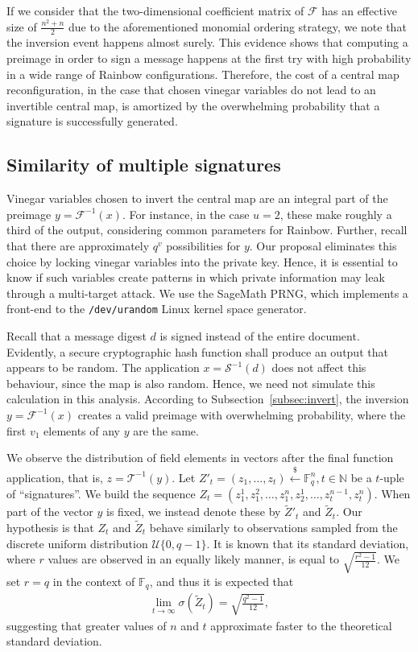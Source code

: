 \documentclass[draft, 12pt, a4paper, oneside]{memoir}
\newcommand{\random}{\stackrel{\$}{\longleftarrow}}
\theoremstyle{definition}
\begin{document}
If we consider that the two-dimensional coefficient matrix of $\mathcal{F}$ has
an effective size of $\frac{n^{2} + n}{2}$ due to the aforementioned monomial
ordering strategy, we note that the inversion event happens almost surely.
This evidence shows that computing a preimage in order to sign a message
happens at the first try with high probability in a wide range of Rainbow
configurations. Therefore, the cost of a central map reconfiguration, in the
case that chosen vinegar variables do not lead to an invertible central map, is
amortized by the overwhelming probability that a signature is successfully
generated.

\subsection{Similarity of multiple signatures}\label{subsec:similar}

Vinegar variables chosen to invert the central map are an integral part of the
preimage $y = \mathcal{F}^{-1}(x)$. For instance, in the case $u = 2$, these
make roughly a third of the output, considering common parameters for Rainbow.
Further, recall that there are approximately $q^v$ possibilities for $y$. Our
proposal eliminates this choice by locking vinegar variables into the private
key. Hence, it is essential to know if such variables create patterns in which
private information may leak through a multi-target attack. We use the SageMath
PRNG, which implements a front-end to the \texttt{/dev/urandom} Linux kernel
space generator.

Recall that a message digest $d$ is signed instead of the entire document.
Evidently, a secure cryptographic hash function shall produce an output that
appears to be random. The application $x = \mathcal{S}^{-1}(d)$ does not affect
this behaviour, since the map is also random. Hence, we need not simulate this
calculation in this analysis. According to Subsection~\ref{subsec:invert}, the
inversion $y = \mathcal{F}^{-1}(x)$ creates a valid preimage with overwhelming
probability, where the first $v_{1}$ elements of any $y$ are the same.

We observe the distribution of field elements in vectors after the final
function application, that is, $z = \mathcal{T}^{-1}(y)$. Let
$Z'_{t} = (z_{1}, \dots, z_{t}) \random \mathbb{F}_{q}^{n}, t \in \mathbb{N}$ be
a $t$-uple of ``signatures''. We build the sequence $Z_{t} = (z_{1}^{1},
z_{1}^{2}, \dots, z_{1}^{n}, z_{2}^{1}, \dots, z_{t}^{n - 1}, z_{t}^{n})$.
When part of the vector $y$ is fixed, we instead denote these by
$\widetilde{Z}'_{t}$ and $\widetilde{Z}_{t}$. Our hypothesis is that $Z_{t}$
and $\widetilde{Z}_{t}$ behave similarly to observations sampled from the
discrete uniform distribution $\mathcal{U}\{0, q - 1\}$. It is known that its
standard deviation, where $r$ values are observed in an equally likely manner,
is equal to $\sqrt{\frac{r^{2} - 1}{12}}$. We set $r = q$ in the context of $\mathbb{F}_{q}$, and thus it is expected that
\begin{align}
  \lim_{t \to \infty} \sigma(\widetilde{Z}_{t}) = \sqrt{\frac{q^{2} - 1}{12}},
\end{align}
suggesting that greater values of $n$ and $t$ approximate faster to the
theoretical standard deviation.
\end{document}
